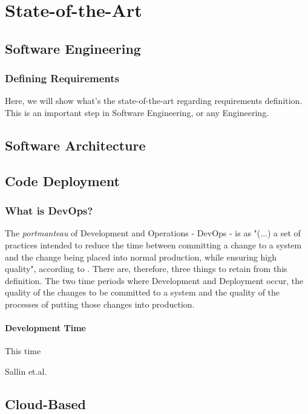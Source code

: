 \chapter{State-of-the-Art}
\label{state-of-the-art}

\section{Software Engineering}
\label{state-of-the-art:s:software-engineering}

\subsection{Defining Requirements}
\label{state-of-the-art:ss:defining-requirements}

Here, we will show what's the state-of-the-art regarding requirements definition. This is an important step in Software Engineering, or any Engineering.

\section{Software Architecture}
\label{state-of-the-art:s:software-architecture}

\section{Code Deployment}
\label{state-of-the-art:s:code-deployment}

\subsection{What is DevOps?}
\label{state-of-the-art:ss:what-is-devops}

The \textit{portmanteau} of Development and Operations - DevOps - is as "(...) a set of practices intended to reduce the time between committing a change to a system and the change being placed into normal production, while ensuring high quality", according to \parencite{bass_weber_zhu_2015}. There are, therefore, three things to retain from this definition. The two time periods where Development and Deployment occur, the quality of the changes to be committed to a system and the quality of the processes of putting those changes into production.

\subsubsection{Development Time}
This time 






Sallin et.al. \parencite{sallin_kropp_anslow_quilty_meier_2021}

\section{Cloud-Based}
\label{state-of-the-art:s:cloud-based}